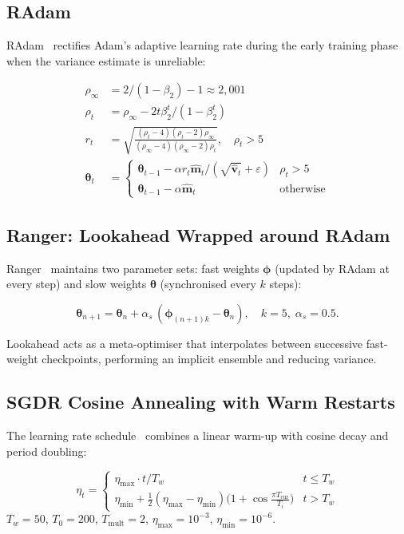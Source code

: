 \documentclass[10pt,conference,letterpaper]{IEEEtran}
\begin{document}
\subsection{RAdam}

RAdam~\cite{liu2019radam} rectifies Adam's adaptive learning rate during the
early training phase when the variance estimate is unreliable:
\begin{tcolorbox}[eqbox]
\begin{align}
  \rho_\infty &= 2/(1-\beta_2)-1 \approx 2{,}001 \nonumber\\
  \rho_t      &= \rho_\infty - 2t\beta_2^t/(1-\beta_2^t) \nonumber\\
  r_t         &= \sqrt{\tfrac{(\rho_t-4)(\rho_t-2)\rho_\infty}
                              {(\rho_\infty-4)(\rho_\infty-2)\rho_t}},
  \quad\rho_t>5 \label{eq:radam}\\
  \bm{\theta}_t &= \begin{cases}
    \bm{\theta}_{t-1}-\alpha r_t\hat{\bm{m}}_t/(\sqrt{\hat{\bm{v}}_t}+\varepsilon)
      & \rho_t>5 \\
    \bm{\theta}_{t-1}-\alpha\hat{\bm{m}}_t & \text{otherwise}
  \end{cases} \nonumber
\end{align}
\end{tcolorbox}

\subsection{Ranger: Lookahead Wrapped around RAdam}

Ranger~\cite{zhang2019lookahead} maintains two parameter sets: fast weights
$\bm{\phi}$ (updated by RAdam at every step) and slow weights $\bm{\theta}$
(synchronised every $k$ steps):
\begin{tcolorbox}[eqbox]
\[
  \bm{\theta}_{n+1} = \bm{\theta}_n
    + \alpha_s\,(\bm{\phi}_{(n+1)k}-\bm{\theta}_n),\quad
  k=5,\;\alpha_s=0.5.
\]
\end{tcolorbox}
Lookahead acts as a meta-optimiser that interpolates between successive fast-weight
checkpoints, performing an implicit ensemble and reducing variance.

\subsection{SGDR Cosine Annealing with Warm Restarts}

The learning rate schedule~\cite{loshchilov2017sgdr} combines a linear warm-up
\cite{goyal2017warmup} with cosine decay and period doubling:
\begin{tcolorbox}[eqbox]
\[
  \eta_t = \begin{cases}
    \eta_\text{max}\cdot t/T_w & t\le T_w \\[2pt]
    \eta_\text{min}+\tfrac{1}{2}(\eta_\text{max}-\eta_\text{min})
    \bigl(1+\cos\tfrac{\pi T_\text{cur}}{T_i}\bigr) & t>T_w
  \end{cases}
\]
$T_w{=}50$, $T_0{=}200$, $T_\text{mult}{=}2$,
$\eta_\text{max}{=}10^{-3}$, $\eta_\text{min}{=}10^{-6}$.
\end{tcolorbox}
\end{document}
